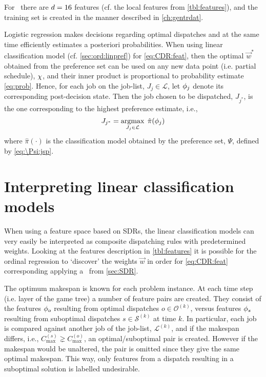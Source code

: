For \jsp\ there are $d=16$ features (cf. the local features from 
\cref{tbl:features}), and the training set is created in the 
manner described in \cref{ch:gentrdat}.

Logistic regression makes decisions regarding optimal dispatches and at the 
same time efficiently estimates a posteriori probabilities. When using linear 
classification model (cf. \cref{sec:ord:linpref}) for \cref{eq:CDR:feat},
then the optimal $\vec{w}^*$ obtained from the preference set can be used on 
any new data point (i.e. partial schedule), ${\mathbf{\chi}}$, and their inner product is 
proportional to probability estimate \cref{eq:prob}. 
Hence, for each job on the job-list, $J_j\in\mathcal{L}$, let ${\mathbf{\phi}}_j$ denote 
its corresponding  post-decision state. Then the job chosen to be dispatched, 
$J_{j^*}$, is the one corresponding to the highest preference estimate, i.e.,
\begin{equation}\label{eq:lin}
	J_{j^*}=\argmax_{J_j\in \mathcal{L}}\; \hat{\pi}(\vphi_j)
\end{equation}
where $\hat{\pi}(\cdot)$ is the classification model obtained by the preference 
set, $\Psi$, defined by \cref{eq:\Psi:jsp}. 


\section{Interpreting linear classification models}

When using a feature space based on SDRs, the linear classification models can 
very easily be interpreted as composite dispatching rules with predetermined 
weights. 
Looking at the features description in \cref{tbl:features} it is possible for 
the ordinal regression to `discover' the weights $\vec{w}$ in order for 
\cref{eq:CDR:feat} corresponding applying a \sdr~from \cref{sec:SDR}. 

The optimum makespan is known for each problem instance. 
At each time step (i.e. layer of the game tree) a number of feature pairs are created. 
They consist of the features ${\mathbf{\phi}}_o$ resulting from optimal dispatches $o\in\mathcal{O}^{(k)}$, versus features ${\mathbf{\phi}}_s$ resulting from suboptimal dispatches $s\in\mathcal{S}^{(k)}$ at time $k$. 
In particular, each job is compared against another job of the job-list, 
$\mathcal{L}^{(k)}$, and if the makespan differs, i.e., $C_{\max}^{(s)}\gneq 
C_{\max}^{(o)}$, an optimal/suboptimal pair is created. 
However if the makespan would be unaltered, the pair is omitted since they give the same optimal makespan. 
This way, only features from a dispatch resulting in a suboptimal solution is labelled undesirable.

